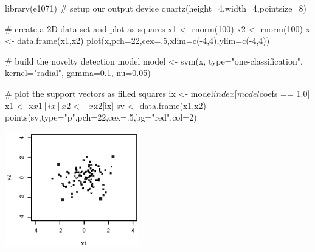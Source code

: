 \documentclass[a4paper,blends,pdf,colorBG,slideColor]{prosper}
\begin{document}
\es


\begin{Rcode}
library(e1071)
# setup our output device
quartz(height=4,width=4,pointsize=8)

# create a 2D data set and plot as squares
x1 <- rnorm(100)
x2 <- rnorm(100)
x <- data.frame(x1,x2)
plot(x,pch=22,cex=.5,xlim=c(-4,4),ylim=c(-4,4))

# build the novelty detection model
model <- svm(x,
             type="one-classification",
             kernel="radial",
             gamma=0.1,
             nu=0.05)

# plot the support vectors as filled squares
ix <- model$index[model$coefs == 1.0]
x1 <- x$x1[ix]
x2 <- x$x2[ix]
sv <- data.frame(x1,x2)
points(sv,type="p",pch=22,cex=.5,bg="red",col=2)
\end{Rcode}
\es


\begin{center}
\includegraphics[height=50mm]{figures/fig13-04.eps}
\end{center}
\es
\end{document}
